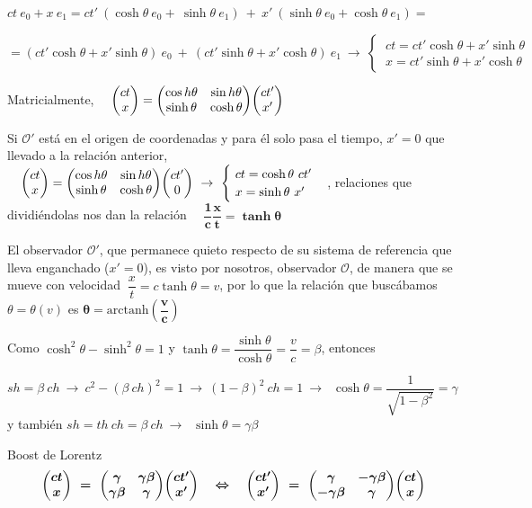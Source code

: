  $ct \ e_0+x\ e_1 = ct'\ (\cosh \theta \ e_0 + \ \sinh \theta \ e_1) \ + \ x'\ ( \sinh \theta \ e_0 + \cosh \theta \ e_1) =$
 
$= (ct' \cosh \theta + x' \sinh \theta) \ e_0 \ + \ (ct' \sinh \theta +x' \cosh \theta) \  e_1  \ \to \ \begin{cases} \ ct=ct' \cosh \theta + x'\sinh \theta \\ \ x=ct' \sinh \theta + x' \cosh \theta \end{cases}$
	 
	
Matricialmente, $\quad \mqty(ct\\x) = \mqty(\cos h \theta & \sin h \theta \\ \sinh \theta & \cosh \theta) \mqty(ct'\\x')$

Si $\mathcal O'$ está en el origen de coordenadas y para él solo pasa el tiempo, $x'=0$ que llevado a la relación anterior,
$\quad \mqty(ct\\x) = \mqty(\cos h \theta & \sin h \theta \\ \sinh \theta & \cosh \theta) \mqty(ct'\\0) \ \to \ \begin{cases} \ ct=\cosh \theta \ ct' \\ \ x=\sinh \theta \ x' \end{cases}$, relaciones que dividiéndolas nos dan la relación $\quad \boldsymbol{\dfrac 1 c \dfrac x t = \tanh \theta}$

El observador $\mathcal O'$, que permanece quieto respecto de su sistema de referencia que lleva enganchado ($x'=0$), es visto por nosotros, observador $\mathcal O$, de manera que se mueve con velocidad $\ \dfrac x t =c \tanh \theta  = v$, por lo que la relación que buscábamos $\theta=\theta(v)$ es $\boldsymbol{ \theta=\mathrm{arctanh} \left( \dfrac v c \right) }$
	
Como $\cosh^2 \theta -\sinh^2 \theta=1$ y $\tanh \theta=\dfrac {\sinh \theta}{\cosh \theta}=\dfrac v c =\beta$, entonces
	
\textcolor{gris}{$sh=\beta \ ch \ \to \ c^2-(\beta \ ch)^2=1 \ \to \ (1-\beta)^2 \ ch = 1 \ \to \ $} $\cosh \theta = \dfrac 1{\sqrt{1-\beta^2}}=\gamma$ y también \textcolor{gris}{$sh=th\ ch =\beta \ ch\ \to \ $} $\sinh \theta = \gamma \beta $

\vspace{5mm}
\begin{large}
\begin{myblock}{Boost de Lorentz}
\begin{equation}
\label{T30boostLorentz}
\boldsymbol{
\mqty(ct\\x) \ = \ \mqty(\gamma & \gamma \beta \\ \gamma \beta & \gamma ) \mqty(ct'\\x')
\quad \Leftrightarrow \quad
\mqty(ct'\\x') \ = \ \mqty(\gamma & -\gamma \beta \\ -\gamma \beta & \gamma ) \mqty(ct\\x)
}	
\end{equation}
\end{myblock}
\end{large}
\vspace{5mm}

